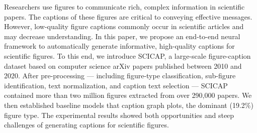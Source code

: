 Researchers use figures to communicate rich, complex information in scientific papers. The captions of these figures are critical to conveying effective messages. However, low-quality figure captions commonly occur in scientific articles and may decrease understanding. In this paper, we propose an end-to-end neural framework to automatically generate informative, high-quality captions for scientific figures. To this end, we introduce SCICAP, a large-scale figure-caption dataset based on computer science arXiv papers published between 2010 and 2020. After pre-processing --- including figure-type classification, sub-figure identification, text normalization, and caption text selection --- SCICAP contained more than two million figures extracted from over 290,000 papers. We then established baseline models that caption graph plots, the dominant (19.2\%) figure type. The experimental results showed both opportunities and steep challenges of generating captions for scientific figures.

